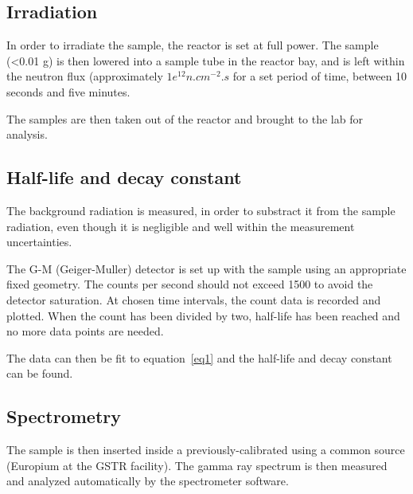 \subsection{Irradiation}

In order to irradiate the sample, the reactor is set at full power. The sample (<0.01 g) is then lowered into a sample tube in the reactor bay, and is left within the neutron flux (approximately $1e^{12} n.cm^{-2}.s$  for a set period of time, between 10 seconds and five minutes.

The samples are then taken out of the reactor and brought to the lab for analysis.

\subsection{Half-life and decay constant}

The background radiation is measured, in order to substract it from the sample radiation, even though it is negligible and well within the measurement uncertainties.

The G-M (Geiger-Muller) detector is set up with the sample using an appropriate fixed geometry. The counts per second should not exceed 1500 to avoid the detector saturation. At chosen time intervals, the count data is recorded and plotted. When the count has been divided by two, half-life has been reached and no more data points are needed.

The data can then be fit to equation~\ref{eq1} and the half-life and decay constant can be found.

\subsection{Spectrometry}

The sample is then inserted inside a previously-calibrated using a common source (Europium at the GSTR facility). The gamma ray spectrum is then measured and analyzed automatically by the spectrometer software.
